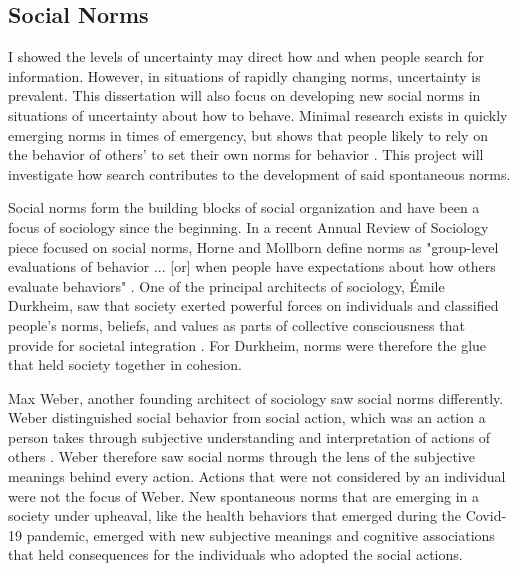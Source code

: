 \subsection{Social Norms}
I showed the levels of uncertainty may direct how and when people
search for information. However, in situations of rapidly changing norms,
uncertainty is prevalent. This dissertation will also focus on developing
new social norms in situations of uncertainty about how to behave. 
Minimal research exists in quickly emerging
norms in times of emergency, but shows that people likely to rely on the
behavior of others' to set their own norms for behavior \citep{alvarez2018,
horneNormsIntegratedFramework2020}. This project will investigate how search
contributes to the development of said spontaneous norms.

Social norms form the building blocks of social organization and have been a
focus of sociology since the beginning. In a recent Annual Review of Sociology
piece focused on social norms, Horne and Mollborn define norms as "group-level
evaluations of behavior ... [or] when people have expectations about how others
evaluate behaviors" \citeyearpar[p. 468-69]{horneNormsIntegratedFramework2020}.
One of the principal architects of sociology, \'{E}mile Durkheim, saw that
society exerted powerful forces on individuals and classified people's norms,
beliefs, and values as parts of collective consciousness that provide for
societal integration \citeyearpar{durkheimSuicide1897, durkheimDivisionLaborSociety1933}.
For Durkheim, norms were therefore the glue that held society together in cohesion.

Max Weber, another founding architect of sociology saw social norms differently.
Weber distinguished social behavior from social action, which was an action a
person takes through subjective understanding and interpretation of actions of
others \citeyearpar{weber1978economy}. Weber therefore saw social norms through
the lens of the subjective meanings behind every action. Actions that were not
considered by an individual were not the focus of Weber. New spontaneous norms
that are emerging in a society under upheaval, like the health behaviors that
emerged during the Covid-19 pandemic, emerged with new subjective meanings and
cognitive associations that held consequences for the individuals who adopted
the social actions.

